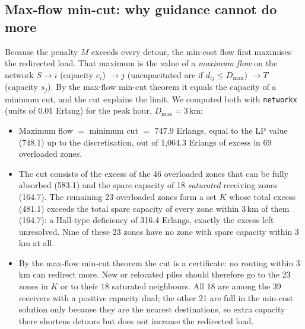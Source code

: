 \documentclass[11pt,a4paper]{article}
\begin{document}
\subsection{Max-flow min-cut: why guidance cannot do more}
Because the penalty $M$ exceeds every detour, the min-cost flow first maximises the redirected load. That maximum is the value of a \emph{maximum flow} on the network $S \to i$ (capacity $e_i$) $\to j$ (uncapacitated arc if $d_{ij} \le D_{\max}$) $\to T$ (capacity $s_j$). By the max-flow min-cut theorem it equals the capacity of a minimum cut, and the cut explains the limit. We computed both with \texttt{networkx} (units of 0.01 Erlang) for the peak hour, $D_{\max} = 3$\,km:
\begin{itemize}[leftmargin=1.3em,itemsep=1pt]
\item Maximum flow $=$ minimum cut $=$ 747.9 Erlangs, equal to the LP value (748.1) up to the discretisation, out of 1{,}064.3 Erlangs of excess in 69 overloaded zones.
\item The cut consists of the excess of the 46 overloaded zones that can be fully absorbed (583.1) and the spare capacity of 18 \emph{saturated} receiving zones (164.7). The remaining 23 overloaded zones form a set $K$ whose total excess (481.1) exceeds the total spare capacity of every zone within 3\,km of them (164.7): a Hall-type deficiency of 316.4 Erlangs, exactly the excess left unresolved. Nine of these 23 zones have no zone with spare capacity within 3\,km at all.
\item By the max-flow min-cut theorem the cut is a certificate: no routing within 3\,km can redirect more. New or relocated piles should therefore go to the 23 zones in $K$ or to their 18 saturated neighbours. All 18 are among the 39 receivers with a positive capacity dual; the other 21 are full in the min-cost solution only because they are the nearest destinations, so extra capacity there shortens detours but does not increase the redirected load.
\end{itemize}
\end{document}
